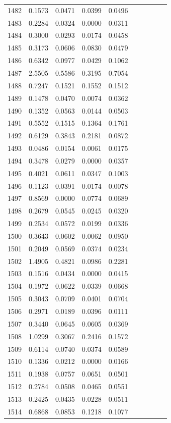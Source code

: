 \begin{table}
\begin{tabular}{cccccccccc}
1482& 0.1573& 0.0471& 0.0399& 0.0496\\ 
1483& 0.2284& 0.0324& 0.0000& 0.0311\\ 
1484& 0.3000& 0.0293& 0.0174& 0.0458\\ 
1485& 0.3173& 0.0606& 0.0830& 0.0479\\ 
1486& 0.6342& 0.0977& 0.0429& 0.1062\\ 
1487& 2.5505& 0.5586& 0.3195& 0.7054\\ 
1488& 0.7247& 0.1521& 0.1552& 0.1512\\ 
1489& 0.1478& 0.0470& 0.0074& 0.0362\\ 
1490& 0.1352& 0.0563& 0.0144& 0.0503\\ 
1491& 0.5552& 0.1515& 0.1364& 0.1761\\ 
1492& 0.6129& 0.3843& 0.2181& 0.0872\\ 
1493& 0.0486& 0.0154& 0.0061& 0.0175\\ 
1494& 0.3478& 0.0279& 0.0000& 0.0357\\ 
1495& 0.4021& 0.0611& 0.0347& 0.1003\\ 
1496& 0.1123& 0.0391& 0.0174& 0.0078\\ 
1497& 0.8569& 0.0000& 0.0774& 0.0689\\ 
1498& 0.2679& 0.0545& 0.0245& 0.0320\\ 
1499& 0.2534& 0.0572& 0.0199& 0.0336\\ 
1500& 0.3643& 0.0602& 0.0062& 0.0950\\ 
1501& 0.2049& 0.0569& 0.0374& 0.0234\\ 
1502& 1.4905& 0.4821& 0.0986& 0.2281\\ 
1503& 0.1516& 0.0434& 0.0000& 0.0415\\ 
1504& 0.1972& 0.0622& 0.0339& 0.0668\\ 
1505& 0.3043& 0.0709& 0.0401& 0.0704\\ 
1506& 0.2971& 0.0189& 0.0396& 0.0111\\ 
1507& 0.3440& 0.0645& 0.0605& 0.0369\\ 
1508& 1.0299& 0.3067& 0.2416& 0.1572\\ 
1509& 0.6114& 0.0740& 0.0374& 0.0589\\ 
1510& 0.1336& 0.0212& 0.0000& 0.0166\\ 
1511& 0.1938& 0.0757& 0.0651& 0.0501\\ 
1512& 0.2784& 0.0508& 0.0465& 0.0551\\ 
1513& 0.2425& 0.0435& 0.0228& 0.0511\\ 
1514& 0.6868& 0.0853& 0.1218& 0.1077\\ 

\end{tabular}
\end{table}
